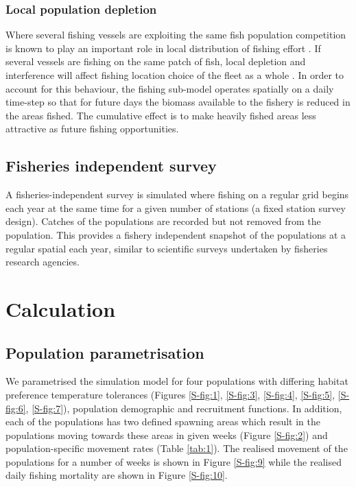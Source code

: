 \documentclass[review]{elsarticle}
\begin{document}
\subsubsection{Local population depletion}

Where several fishing vessels are exploiting the same fish population
competition is known to play an important role in local distribution of fishing
effort \citep{Gillis1998}. If several vessels are fishing on the same patch of
fish, local depletion and interference  will affect
fishing location choice of the fleet as a whole \citep{Rijnsdorp2000,
	Poos2007a}. In order to account for this behaviour, the fishing
sub-model operates spatially on a daily time-step so that for future days the
biomass available to the fishery is reduced in the areas fished. The cumulative
effect is to make heavily fished areas less attractive as future fishing
opportunities. 

\subsection{Fisheries independent survey}

A fisheries-independent survey is simulated where fishing on a regular grid
begins each year at the same time for a given number of stations (a fixed
station survey design). Catches of the populations  are recorded but not removed from the population. This
provides a fishery independent snapshot of the populations at a regular spatial
 each year, similar to scientific
surveys undertaken by fisheries research agencies. 

\section{Calculation}

\subsection{Population parametrisation}

We parametrised the simulation model for four populations with differing
habitat preference temperature tolerances (Figures
\ref{S-fig:1}, \ref{S-fig:3}, \ref{S-fig:4}, \ref{S-fig:5}, \ref{S-fig:6},
\ref{S-fig:7}), population demographic and recruitment functions. In addition,
each of the populations has two defined spawning areas which result in the
populations moving towards these areas in given weeks (Figure \ref{S-fig:2})
and population-specific movement rates (Table \ref{tab:1}). The realised
movement of the populations for a number of weeks is shown in Figure
\ref{S-fig:9} while the realised daily fishing mortality are shown in Figure
\ref{S-fig:10}. 
\end{document}
